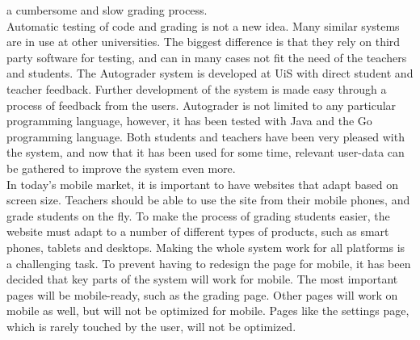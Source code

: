 a cumbersome and slow grading process. \\Automatic testing of code and grading is not a new idea. Many similar systems are in use at other universities. The biggest difference is that they rely on third party software for testing, and can in many cases not fit the need of the teachers and students. The Autograder system is developed at UiS with direct student and teacher feedback. Further development of the system is made easy through a process of feedback from the users. Autograder is not limited to any particular programming language, however, it has been tested with Java and the Go programming language. Both students and teachers have been very pleased with the system, and now that it has been used for some time, relevant user-data can be gathered to improve the system even more. \\In today's mobile market, it is important to have websites that adapt based on screen size. Teachers should be able to use the site from their mobile phones, and grade students on the fly. To make the process of grading students easier, the website must adapt to a number of different types of products, such as smart phones, tablets and desktops. Making the whole system work for all platforms is a challenging task. To prevent having to redesign the page for mobile, it has been decided that key parts of the system will work for mobile. The most important pages will be mobile-ready, such as the grading page. Other pages will work on mobile as well, but will not be optimized for mobile. Pages like the settings page, which is rarely touched by the user, will not be optimized.

